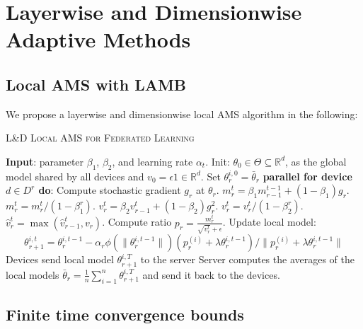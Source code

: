 \documentclass{article}
\begin{document}
\section{Layerwise and Dimensionwise Adaptive Methods}\label{sec:main}


\subsection{Local AMS with LAMB}

We propose a layerwise and dimensionwise local AMS algorithm in the following:

\begin{algorithm}[H]
\caption{\textsc{L\&D Local AMS for Federated Learning}} \label{alg:ldams}
\begin{algorithmic}[1]
\STATE \textbf{Input}: parameter $\beta_1$, $\beta_2$, and learning rate $\alpha_t$. 
\STATE Init: $\theta_{0} \in \Theta \subseteq \mathbb R^d $, as the global model shared by all devices and $v_{0} = \epsilon 1 \in \mathbb R^{d}$.
\STATE Set $\theta_{r}^{i,0} = \bar{\theta}_r$
\STATE\textbf{parallel for device $d \in D^{r}$ do}:
\STATE Compute stochastic gradient $g_r$ at $\theta_r$.
\quad \quad {}
\STATE $m^t_r = \beta_1 m^{t-1}_{r-1} + (1 - \beta_1) g_r$.
\STATE $m^{t}_{r}=m^{t}_{r} /\left(1-\beta_{1}^{r}\right)$.
\STATE $v^{t}_r = \beta_2 v^{t}_{r-1} + (1 - \beta_2) g_r^2$.
\STATE $v^{t}_r=v^{t}_r /\left(1-\beta_{2}^{r}\right)$.
\STATE $\hat{v}^{t}_r = \max( \hat{v}^{t}_{r-1} , v_r )$.
\STATE Compute ratio  $p_{r}=\frac{m^{t}_{r}}{\sqrt{v^{t}_{r}}+\epsilon}$.
\STATE Update local model:
$$\theta_{r+1}^{i,t}=\theta_{r}^{i,t-1}-\alpha_{r} \phi(\|\theta_{r}^{i,t-1}\|)(p_{r}^{(i)}+\lambda \theta_{r}^{i,t-1}) / \|p_{r}^{(i)}+\lambda \theta_{r}^{i,t-1}\|$$
\ENDFOR
\STATE Devices send local model $\theta_{r+1}^{i,T}$ to the server
\STATE Server computes the averages of the local models $\bar{\theta}_r = \frac{1}{n} \sum_{i=1}^n \theta_{r+1}^{i,T}$ and send it back to the devices.
\ENDFOR
\end{algorithmic}
\end{algorithm}


\subsection{Finite time convergence bounds}
\end{document}
